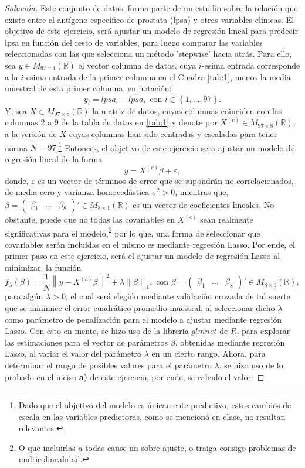 \documentclass[10.5pt,notitlepage]{article}
\newenvironment{solucion}
  {\begin{proof}[Solución]}
  {\end{proof}}
\newcommand{\RR}{\mathbb{R}}
\newcommand{\ee}{\varepsilon}
\newcommand{\norm}[1]{\left\| #1 \right\|}
\newcommand{\kis}[1]{\left\{ #1 \right\}}
\newcommand{\Matrix}[1]{\begin{pmatrix} #1 \end{pmatrix}}
\theoremstyle{plain}
\begin{document}
\begin{solucion}
Este conjunto de datos, forma parte de un estudio sobre la relación que existe entre el antígeno específico de prostata (lpsa) y otras variables clínicas. El objetivo de este ejercicio, será ajustar un modelo de regresión lineal para predecir lpsa en función del resto de variables, para luego comparar las variables seleccionadas
con las que selecciona un método 'stepwise' hacia atrás. Para ello, sea \(y\in M_{97 \times 1}(\RR)\) el vector columna de datos, cuya \(i\)-esima entrada corresponde a la \(i\)-esima entrada de la primer columna en el Cuadro \ref{tab:1}, menos la media muestral de esta primer columna, en notación:   
\[
y_i = lpsa_i  - \overline{lpsa}, \text{ con } i \in \kis{1, \hdots, 97}.
\]
Y, sea \(X\in M_{97 \times 8}(\RR)\) la matriz de datos, cuyas columnas coinciden con las columnas \(2\) a \(9\) de la tabla de datos en \ref{tab:1} y denote por \(X^{(c)}\in M_{97 \times 8}(\RR)\), a la versión de \(X\) cuyas columnas han sido centradas y escaladas para tener norma \(N = 97\).\footnote{Dado que el objetivo del modelo es únicamente predictivo, estos cambios de escala en las variables predictoras, como se mencionó en clase, no resultan relevantes.} Entonces, el objetivo de este ejercicio sera ajustar un modelo de regresión lineal de la forma 
\begin{equation}\label{lab.mode}
    y = X^{(c)}\beta  + \ee,
\end{equation}
donde, \(\ee\) es un vector de términos de error que se supondrán no correlacionados, de media cero y varianza homocedástica \(\sigma^2 >0\), mientras que, \(\beta = \Matrix{\beta_1 & \hdots & \beta_8}'\in M_{8 \times 1}(\RR)\) es un vector de coeficientes lineales. No obstante, puede que no todas las covariables en \(X^{(c)}\) sean realmente significativas para el modelo,\footnote{O que incluirlas a todas cause un sobre-ajuste, o traiga consigo problemas de multicolinealidad.} por lo que, una forma de seleccionar que covariables serán incluidas en el mismo es mediante regresión Lasso. Por ende, el primer paso en este ejercicio, será el ajustar un modelo de regresión Lasso al minimizar, la función   
\[
f_{\lambda}(\beta) = \frac{1}{N}\norm{y - X^{(c)}\beta}^2 + \lambda\norm{\beta}_1, \text{ con } \beta = \Matrix{\beta_1 & \hdots & \beta_8}'\in M_{8 \times 1}(\RR),
\]
para algún \(\lambda > 0\), el cual será elegido mediante validación cruzada de tal suerte que se minimice el error cuadrático promedio muestral, al seleccionar dicho \(\lambda\) como parámetro de penalización para el modelo a ajustar mediante regresión Lasso. Con esto en mente, se hizo uso de la librería \(glmnet\) de \(R\), para explorar las estimaciones para el vector de parámetros \(\beta\), obtenidas mediante regresión Lasso, al variar el valor del parámetro \(\lambda\) en un cierto rango. Ahora, para determinar el rango de posibles valores para el parámetro \(\lambda\), se hizo uso de lo probado en el inciso \textbf{a)} de este ejercicio, por ende, se calculo el valor:

\end{solucion}
\end{document}
